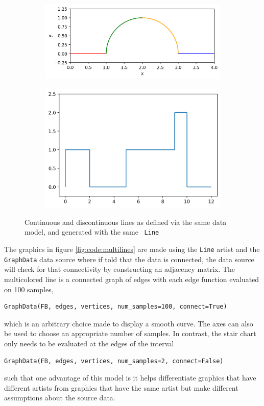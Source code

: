 \documentclass[../main.tex]{subfiles}
\begin{document}
\begin{figure}[htb]
    \begin{subfigure}{.49\textwidth}
        \includegraphics[width=\textwidth]{figures/code/linec_1.png}
    \end{subfigure}
    \begin{subfigure}{.49\textwidth}
        \includegraphics[width=\textwidth]{figures/code/lined_1.png}
    \end{subfigure}
\caption{Continuous and discontinuous lines as defined via the same data model, and generated with the same \vartisteq\ \texttt{Line}}
\label{fig:code:multilines}
\end{figure}
The graphics in figure \autoref{fig:code:multilines} are made using the \texttt{Line} artist and the \texttt{GraphData} data source where if told that the data is connected, the data source will check for that connectivity by constructing an adjacency matrix. The multicolored line is a connected graph of edges with each edge function evaluated on 100 samples, 
\begin{verbatim}
GraphData(FB, edges, vertices, num_samples=100, connect=True)
\end{verbatim}
which is an arbitrary choice made to display a smooth curve. The axes can also be used to choose an appropriate number of samples. In contrast, the stair chart only needs to be evaluated at the edges of the interval 
\begin{verbatim}
GraphData(FB, edges, vertices, num_samples=2, connect=False)
\end{verbatim}
such that one advantage of this model is it helps differentiate graphics that have different artists from graphics that have the same artist but make different assumptions about the source data.
\end{document}
